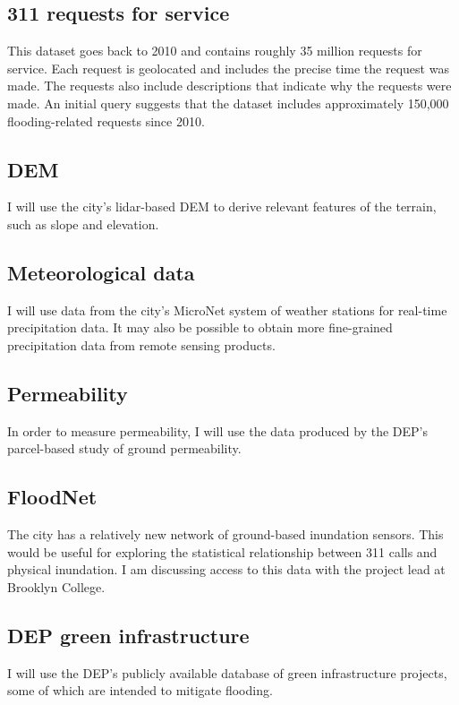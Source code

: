 \documentclass[11pt]{article}
\begin{document}
\subsection{311 requests for service}
\label{sec:org2ef3656}
This dataset goes back to 2010 and contains roughly 35 million requests for service. Each request is geolocated and includes the precise time the request was made. The requests also include descriptions that indicate why the requests were made. An initial query suggests that the dataset includes approximately 150,000 flooding-related requests since 2010.

\subsection{DEM}
\label{sec:org74988d2}
I will use the city's lidar-based DEM to derive relevant features of the terrain, such as slope and elevation.

\subsection{Meteorological data}
\label{sec:org5fe2095}
I will use data from the city's MicroNet system of weather stations for real-time precipitation data. It may also be possible to obtain more fine-grained precipitation data from remote sensing products.

\subsection{Permeability}
\label{sec:org69d3dfb}
In order to measure permeability, I will use the data produced by the DEP's parcel-based study of ground permeability.

\subsection{FloodNet}
\label{sec:orga9582cd}
The city has a relatively new network of ground-based inundation sensors. This would be useful for exploring the statistical relationship between 311 calls and physical inundation. I am discussing access to this data with the project lead at Brooklyn College. 

\subsection{DEP green infrastructure}
\label{sec:orgbdefc04}
I will use the DEP's publicly available database of green
infrastructure projects, some of which are intended to mitigate
flooding.
\end{document}
